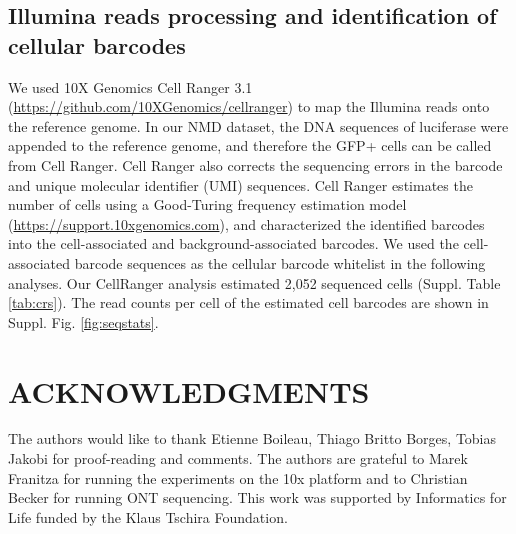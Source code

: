 \documentclass[times, 11pt, a4paper]{article}
\begin{document}
\subsection*{Illumina reads processing and identification of cellular barcodes}
We used 10X Genomics Cell Ranger 3.1 (\url{https://github.com/10XGenomics/cellranger}) %
 to map the Illumina reads onto the reference genome. In our NMD dataset, the DNA sequences of luciferase were appended to the reference genome, and therefore the GFP+ cells can be called from Cell Ranger. Cell Ranger also corrects the sequencing errors in the barcode and unique molecular identifier (UMI) sequences. Cell Ranger estimates the number of cells using a Good-Turing frequency estimation model (\url{https://support.10xgenomics.com}), %
 and characterized the identified barcodes into the cell-associated and background-associated barcodes. We used the cell-associated barcode sequences as the cellular barcode whitelist in the following analyses. Our CellRanger analysis estimated 2,052 sequenced cells (Suppl. Table \ref{tab:crs}). The read counts per cell of the estimated cell barcodes are shown in Suppl. Fig. \ref{fig:seqstats}. 

\section*{ACKNOWLEDGMENTS}
  The authors would like to thank Etienne Boileau, Thiago Britto Borges, Tobias Jakobi for proof-reading and comments.
  The authors are grateful to Marek Franitza for running the experiments on the 10x platform and to Christian Becker for running ONT sequencing.
  This work was supported by Informatics for Life funded by the Klaus Tschira Foundation.
\end{document}
